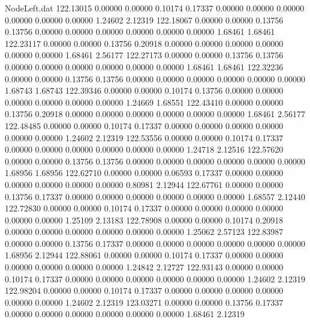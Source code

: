 \begin{filecontents}{NodeLeft.dat}
 122.13015    0.00000    0.00000     0.10174    0.17337    0.00000    0.00000    0.00000    0.00000    0.00000    0.00000    1.24602    2.12319
 122.18067    0.00000    0.00000     0.13756    0.13756    0.00000    0.00000    0.00000    0.00000    0.00000    0.00000    1.68461    1.68461
 122.23117    0.00000    0.00000     0.13756    0.20918    0.00000    0.00000    0.00000    0.00000    0.00000    0.00000    1.68461    2.56177
 122.27173    0.00000    0.00000     0.13756    0.13756    0.00000    0.00000    0.00000    0.00000    0.00000    0.00000    1.68461    1.68461
 122.32236    0.00000    0.00000     0.13756    0.13756    0.00000    0.00000    0.00000    0.00000    0.00000    0.00000    1.68743    1.68743
 122.39346    0.00000    0.00000     0.10174    0.13756    0.00000    0.00000    0.00000    0.00000    0.00000    0.00000    1.24669    1.68551
 122.43410    0.00000    0.00000     0.13756    0.20918    0.00000    0.00000    0.00000    0.00000    0.00000    0.00000    1.68461    2.56177
 122.48485    0.00000    0.00000     0.10174    0.17337    0.00000    0.00000    0.00000    0.00000    0.00000    0.00000    1.24602    2.12319
 122.53556    0.00000    0.00000     0.10174    0.17337    0.00000    0.00000    0.00000    0.00000    0.00000    0.00000    1.24718    2.12516
 122.57620    0.00000    0.00000     0.13756    0.13756    0.00000    0.00000    0.00000    0.00000    0.00000    0.00000    1.68956    1.68956
 122.62710    0.00000    0.00000     0.06593    0.17337    0.00000    0.00000    0.00000    0.00000    0.00000    0.00000    0.80981    2.12944
 122.67761    0.00000    0.00000     0.13756    0.17337    0.00000    0.00000    0.00000    0.00000    0.00000    0.00000    1.68557    2.12440
 122.72830    0.00000    0.00000     0.10174    0.17337    0.00000    0.00000    0.00000    0.00000    0.00000    0.00000    1.25109    2.13183
 122.78908    0.00000    0.00000     0.10174    0.20918    0.00000    0.00000    0.00000    0.00000    0.00000    0.00000    1.25062    2.57123
 122.83987    0.00000    0.00000     0.13756    0.17337    0.00000    0.00000    0.00000    0.00000    0.00000    0.00000    1.68956    2.12944
 122.88061    0.00000    0.00000     0.10174    0.17337    0.00000    0.00000    0.00000    0.00000    0.00000    0.00000    1.24842    2.12727
 122.93143    0.00000    0.00000     0.10174    0.17337    0.00000    0.00000    0.00000    0.00000    0.00000    0.00000    1.24602    2.12319
 122.98204    0.00000    0.00000     0.10174    0.17337    0.00000    0.00000    0.00000    0.00000    0.00000    0.00000    1.24602    2.12319
 123.03271    0.00000    0.00000     0.13756    0.17337    0.00000    0.00000    0.00000    0.00000    0.00000    0.00000    1.68461    2.12319

\end{filecontents}

